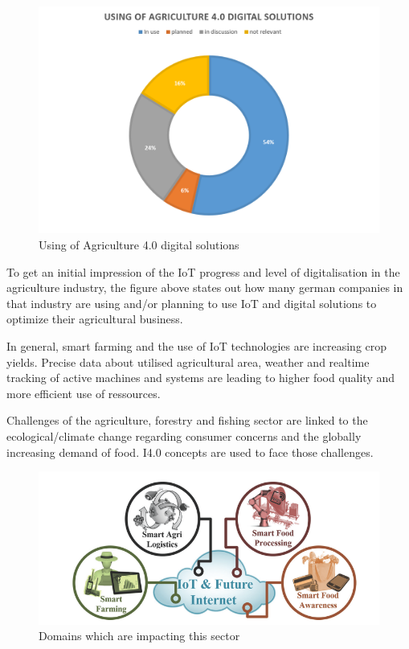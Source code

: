 \begin{figure}[H]
\centering
\includegraphics[width=1\columnwidth]{images/usingOfAgriculure4-0-solutions_pieChart}
\caption{Using of Agriculture 4.0 digital solutions}
\end{figure}


To get an initial impression of the \ac{IoT} progress and level of digitalisation in the agriculture industry, the figure above states out how many german companies in that industry are using and/or planning to use \ac{IoT} and digital solutions to optimize their agricultural business.

In general, smart farming and the use of \ac{IoT} technologies are increasing crop yields. Precise data about utilised agricultural area, weather and realtime tracking of active machines and systems are leading to higher food quality and more efficient use of ressources.

Challenges of the agriculture, forestry and fishing sector are linked to the ecological/climate change regarding consumer concerns and the globally increasing demand of food. \ac{I4.0} concepts are used to face those challenges.

\begin{figure}[H]
\centering
\includegraphics[width=1\columnwidth]{images/digitising-industry_agriculture_smartFarming}
\caption{Domains which are impacting this sector}
\end{figure}

